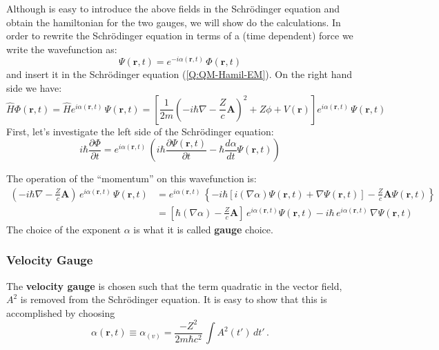 Although is easy to introduce the above fields in the Schr\"{o}dinger equation and obtain the hamiltonian for the two gauges, we will show do the calculations.
In order to rewrite the Schr\"{o}dinger equation in terms of a (time dependent) force we write the wavefunction as:
\begin{equation}
  \label{Q:ph-volkov-1}
  \Psi(\bm{r},t) = e^{-i \alpha(\bm{r},t)} \, \Phi(\bm{r},t)
\end{equation}
and insert it in the Schr\"{o}dinger equation (\ref{Q:QM-Hamil-EM}). On the right hand side we have:
\begin{equation*}
\hat{H} \Phi(\bm{r},t) = \hat{H}  e^{i \alpha(\bm{r},t)} \, \Psi(\bm{r},t) = \left[ \frac{1}{2 m}
\left( - i \hbar \nabla - \frac{Z}{c}\bm{A} \right)^{2} + Z \phi + V(\bm{r})\right]  e^{i \alpha(\bm{r},t)} \, \Psi(\bm{r},t) 
\end{equation*}
%
First, let's investigate the left side of the Schr\"{o}dinger equation:
\begin{equation}
  \label{Q:ph-lhs-sch-eq}
    i \hbar \frac{\partial \Phi}{\partial t} = e^{i \alpha(\bm{r},t)} \, \left(   i \hbar \frac{\partial \Psi(\bm{r},t)}{\partial t} - \hbar \frac{d \alpha}{d t} \Psi(\bm{r},t) \right) 
\end{equation}

The operation of the ``momentum'' on this wavefunction is:
\begin{align}\label{Q:ph-momentum-action}
  \left( - i \hbar \nabla - \frac{Z}{c}\bm{A} \right)\, e^{i \alpha(\bm{r},t)} \, \Psi(\bm{r},t)&= e^{i \alpha(\bm{r},t)} \,  \left\{  - i \hbar  \left[ i (\nabla \alpha) \Psi(\bm{r},t) +  \nabla \Psi(\bm{r},t) \right] - \frac{Z}{c}\bm{A} \Psi(\bm{r},t)  \right\} \nonumber \\
  &= \left[ \hbar (\nabla \alpha) - \frac{Z}{c}\bm{A} \right]\,e^{i \alpha(\bm{r},t)}
  \Psi(\bm{r},t) - i \hbar \, e^{i \alpha(\bm{r},t)} \, \nabla \Psi(\bm{r},t)
\end{align}
The choice of the exponent $\alpha$ is what it is called \textbf{gauge} choice.



\subsubsection{Velocity Gauge}
\label{S:velocity-gauge}
The \textbf{velocity gauge} is chosen such that the term quadratic in the vector field, $A^{2}$ is removed from the Schr\"{o}dinger equation. It is easy to show that this is accomplished by choosing
\begin{equation}
\label{Q:ph-alpha-vel} \alpha(\bm{r},t)\equiv \alpha_{(v)}= \frac{-Z^{2}}{2 m \hbar c^{2}}  \,\int  A^{2}(t') \, dt' \,.
\end{equation}

